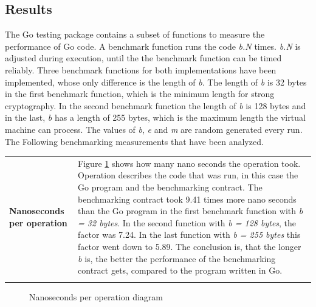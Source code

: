 \subsection{Results}
The Go testing package contains a subset of functions to measure the performance of Go code. A benchmark function runs the code \textit{b.N} times. \textit{b.N} is adjusted during execution, until the the benchmark function can be timed reliably. \cite{golang_testing} Three benchmark functions for both implementations have been implemented, whose only difference is the length of \textit{b}. The length of \textit{b} is 32 bytes in the first benchmark function, which is the minimum length for strong cryptography. In the second benchmark function the length of \textit{b} is 128 bytes and in the last, \textit{b} has a length of 255 bytes, which is the maximum length the virtual machine can process. The values of \textit{b}, \textit{e} and \textit{m} are random generated every run. The Following benchmarking measurements that have been analyzed. 

\begin{tabular}[t]{ p{3cm} p{12.5cm}}
\raggedright
\textbf{Nanoseconds per operation} &
Figure \ref{nperop} shows how many nano seconds the operation took. Operation describes the code that was run, in this case the Go program and the benchmarking contract. The benchmarking contract took 9.41 times more nano seconds than the Go program in the first benchmark function with \textit{b = 32 bytes}. In the second function with \textit{b = 128 bytes}, the factor was 7.24. In the last function with \textit{b = 255 bytes} this factor went down to 5.89. The conclusion is, that the longer \textit{b} is, the better the performance of the benchmarking contract gets, compared to the program written in Go. \\ \\
\end{tabular}

\begin{figure}[H]
	\begin{center}
	\caption{Nanoseconds per operation diagram}
	\label{nperop}
	\end{center}
\end{figure}

